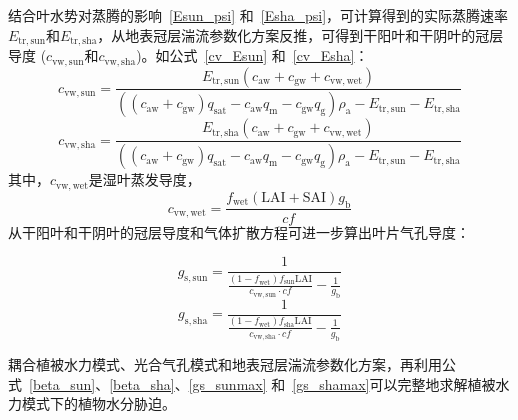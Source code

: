 结合叶水势对蒸腾的影响~\eqref{Esun_psi} 和~\eqref{Esha_psi}，可计算得到的实际蒸腾速率$E_{\mathrm{tr,sun}}$和$E_{\mathrm{tr,sha}}$，从地表冠层湍流参数化方案反推，可得到干阳叶和干阴叶的冠层导度 ($c_{\mathrm{vw,sun}}$和$c_{\mathrm{vw,sha}}$)。如公式~\eqref{cv_Esun} 和~\eqref{cv_Esha}：
\begin{equation}\label{cv_Esun}c_{\mathrm{vw,sun}}=\frac{E_{\mathrm{tr,sun}}\left(c_{\mathrm {aw}}+c_{\mathrm {gw}}+c_{\mathrm{vw,wet}}\right)}{\left(\left(c_{\mathrm {aw}}+c_{\mathrm {gw}}\right)q_{\mathrm{sat}}-c_{\mathrm {aw}} q_{\mathrm {m}} - c_{\mathrm {gw}} q_{\mathrm {g}}\right)\rho_{\mathrm{a}}-E_{\mathrm{tr,sun}}-E_{\mathrm{tr,sha}}}
\end{equation}
%
\begin{equation}\label{cv_Esha}
  c_{\mathrm{vw,sha}}=\frac{E_{\mathrm{tr,sha}}\left(c_{\mathrm {aw}}+c_{\mathrm {gw}}+c_{\mathrm{vw,wet}}\right)}{\left(\left(c_{\mathrm {aw}}+c_{\mathrm {gw}}\right)q_{\mathrm{sat}}-c_{\mathrm {aw}} q_{\mathrm {m}} - c_{\mathrm {gw}} q_{\mathrm {g}}\right)\rho_{\mathrm{a}}-E_{\mathrm{tr,sun}}-E_{\mathrm{tr,sha}}}
\end{equation}
其中，$c_{\mathrm{vw,wet}}$是湿叶蒸发导度，
\begin{equation}\label{cwet}
  c_{\mathrm{vw,wet}}=\frac{f_{\mathrm{wet}}\left(\text{LAI}+\text{SAI}\right)g_{\mathrm {b}}}{cf}
\end{equation}
从干阳叶和干阴叶的冠层导度和气体扩散方程可进一步算出叶片气孔导度：

\begin{equation}\label{gssun_cvsun}
  g_{\mathrm{s,sun}} = \frac{1}{\frac{(1-f_{\mathrm{wet}})f_{\mathrm{sun}}\text{LAI}}{c_{\mathrm{vw,sun}}\cdot cf}-\frac{1}{g_{\mathrm {b}}}}
\end{equation}
\begin{equation}\label{gssun_cvsha}
  g_{\mathrm{s,sha}} = \frac{1}{\frac{(1-f_{\mathrm{wet}})f_{\mathrm{sha}}\text{LAI}}{c_{\mathrm{vw,sha}}\cdot cf}-\frac{1}{g_{\mathrm {b}}}}
\end{equation}


耦合植被水力模式、光合气孔模式和地表冠层湍流参数化方案，再利用公式~\eqref{beta_sun}、\eqref{beta_sha}、\eqref{gs_sunmax} 和~\eqref{gs_shamax}可以完整地求解植被水力模式下的植物水分胁迫。


